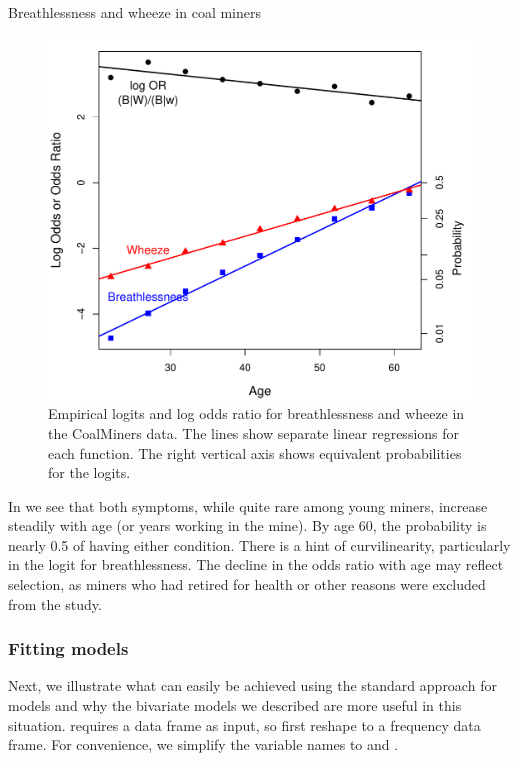 \documentclass[11pt]{book}\usepackage[]{graphicx}\usepackage[]{color}
\newenvironment{knitrout}{}{} %
\renewenvironment{knitrout}{\small\renewcommand{\baselinestretch}{.85}}{} %
\begin{document}
\begin{Example}[coalminers]{Breathlessness and wheeze in coal miners}
\begin{knitrout}
\begin{figure}[!htb]
\centerline{\includegraphics[width=.8\textwidth]{ch08/fig/cm-blogits-1} }

\caption[Empirical logits and log odds ratio for breathlessness and wheeze in the CoalMiners data]{Empirical logits and log odds ratio for breathlessness and wheeze in the CoalMiners data. The lines show separate linear regressions for each function. The right vertical axis shows equivalent probabilities for the logits.\label{fig:cm-blogits}}
\end{figure}


\end{knitrout}
In 
we see that both symptoms, while quite rare among young miners, increase
steadily with age (or years working in the mine).
By age 60, the probability is nearly 0.5 of having either condition.
There is a hint of curvilinearity, particularly in the logit for
breathlessness.
The decline in the odds ratio with age may reflect selection, as miners
who had retired for health or other reasons were excluded from the
study.

\subsubsection*{Fitting  models}
Next, we illustrate what can easily be achieved using the standard 
approach for \loglin models and why the bivariate models we described
are more useful in this situation.   requires a data frame as
input, so first reshape  to a frequency data frame.
For convenience, we simplify the variable names to  and .


\end{Example}
\end{document}
